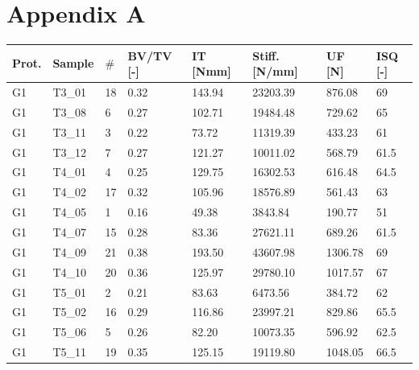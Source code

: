 \documentclass[12pt, a4paper, twoside]{report}
\begin{document}
\section*{Appendix A}
\begin{table}[H]
\begin{tabular}{l|l|l|l|l|l|l|l}
Prot. & Sample & $\#$ & BV/TV {[}-{]} & IT {[}Nmm{]} & Stiff. {[}N/mm{]} & UF {[}N{]} & ISQ {[}-{]} \\ \hline
G1       & T3\_01 & 18 & 0.32          & 143.94            & 23203.39             & 876.08                 & 69          \\
G1       & T3\_08 & 6 & 0.27          & 102.71            & 19484.48             & 729.62                 & 65          \\
G1       & T3\_11 & 3 & 0.22          & 73.72             & 11319.39             & 433.23                 & 61          \\
G1       & T3\_12 & 7 & 0.27          & 121.27            & 10011.02             & 568.79                 & 61.5        \\
G1       & T4\_01 & 4 & 0.25          & 129.75            & 16302.53             & 616.48                 & 64.5        \\
G1       & T4\_02 & 17 & 0.32          & 105.96            & 18576.89             & 561.43                 & 63          \\
G1       & T4\_05 & 1 & 0.16          & 49.38             & 3843.84              & 190.77                 & 51          \\
G1       & T4\_07 & 15 & 0.28          & 83.36             & 27621.11             & 689.26                 & 61.5        \\
G1       & T4\_09 & 21 & 0.38          & 193.50            & 43607.98             & 1306.78                & 69          \\
G1       & T4\_10 & 20 & 0.36          & 125.97            & 29780.10             & 1017.57                & 67          \\
G1       & T5\_01 & 2 & 0.21          & 83.63             & 6473.56              & 384.72                 & 62          \\
G1       & T5\_02 & 16 & 0.29          & 116.86            & 23997.21             & 829.86                 & 65.5        \\
G1       & T5\_06 & 5 & 0.26          & 82.20             & 10073.35             & 596.92                 & 62.5        \\
G1       & T5\_11 & 19 & 0.35          & 125.15            & 19119.80             & 1048.05                & 66.5        \\

\end{tabular}
\end{table}
\end{document}
